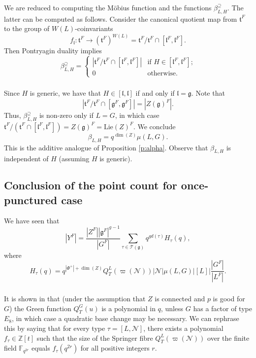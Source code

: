 \documentclass[12pt]{amsart}
\theoremstyle{plain}
\theoremstyle{definition}
\theoremstyle{remark}
\newcommand{\ra}{\rightarrow}
\newcommand{\bY}{{Y}}
\newcommand{\cT}{\mathcal{T}}
\newcommand{\cN}{\mathcal{N}}
\newcommand{\fg}{\mathfrak{g}}
\newcommand{\ft}{\mathfrak{t}}
\newcommand{\fl}{\mathfrak{l}}
\begin{document}
\subsubsection{} We are reduced to computing the M\"{o}bius function and the functions $\beta_{L,H}^\supseteq$. The latter can be computed as follows.  Consider the canonical quotient map from $\ft^F$ to the group of $W(L)$-coinvariants  
\[
f_\fl: \ft^F\ra (\ft^F)^{W(L)} = \ft^F/\ft^F\cap [\fl^F, \fl^F].
\]
Then Pontryagin duality implies 
\[
\beta_{L,H}^\supseteq = 
\begin{cases} |\ft^F/\ft^F\cap [\fl^F,\fl^F]| & \textrm{if $H\in [\fl^F,\fl^F]$;}\\
0 & \textrm{otherwise}. 
\end{cases}
\]

\subsubsection{} Since $H$ is generic, we have that $H\in [\fl,\fl]$ if and only if $\fl=\fg$. Note that 
\[
|\ft^F/\ft^F\cap [\fg^F,\fg^F] |=  |Z(\fg)^F|. 
\]
 Thus, $\beta_{L,H}^\supseteq$ is non-zero only if $L=G$, in which case $\ft^F/(\ft^F\cap [\fl^F, \fl^F])=Z(\fg)^F=\mathrm{Lie}(Z)^F$. We conclude 
\[
\boxed{\beta_{L,H}=q^{\dim(Z)} \mu(L,G).}
\]
 This is the additive analogue of Proposition \ref{p:alpha}. Observe that $\beta_{L,H}$ is independent of $H$ (assuming $H$ is generic). 




\subsection{Conclusion of the point count for once-punctured case}
We have seen that 
\[
|\bY^F| = \frac{|Z^F||\fg^F|^{g-1}}{|G^F|} \sum_{\tau \in \cT(\fg)} q^{gd(\tau)} H_\tau(q),
\]
where 
\[
H_\tau(q) = q^{|\Phi^+|+\dim(Z)}Q_{T}^{L}(\varpi(\cN)) |\cN| \mu(L,G)  |[L]| \frac{|G^F|}{|L^F|}.
\]

\subsubsection{} It is shown in \cite[Theorem 3.10]{GoodwinRohrle} that  (under the assumption that $Z$ is connected and $p$ is good for $G$) the Green function $Q_T^G(u)$ is a polynomial in $q$, unless $G$ has a factor of type $E_8$, in which case a quadratic base change may be necessary. We can rephrase this by saying that for every type $\tau=[L, \cN]$, there exists a polynomial $f_\tau \in \mathbb{Z}[t]$ such that the size of the Springer fibre $Q_{T}^{L}(\varpi(\cN))$ over the finite field $\mathbb{F}_{q^{2r}}$ equals $f_\tau(q^{2r})$ for all positive integers $r$. 
\end{document}
